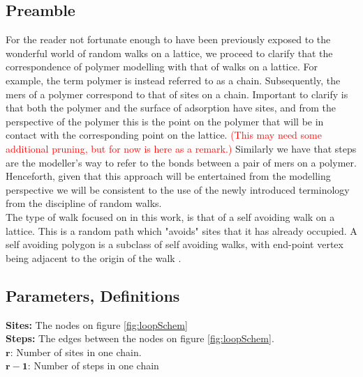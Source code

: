 \documentclass[12pt,letterpaper]{article}
\begin{document}
\subsection{Preamble}

For the reader not fortunate enough to have been previously exposed to the wonderful world of random walks on a lattice, we proceed to clarify that the correspondence of polymer modelling with that of walks on a lattice. For example, the term polymer is instead referred to as a chain. Subsequently, the mers of a polymer correspond to that of sites on a chain. Important to clarify is that both the polymer and the surface of adsorption have sites, and from the perspective of the polymer this is the point on the polymer that will be in contact with the corresponding point on the lattice.
\textcolor{red}{(This may need some additional pruning, but for now is here as a remark.)} 
Similarly we have that steps are the modeller's way to refer to the bonds between a pair of mers on  a polymer. Henceforth, given that this approach will be entertained from the modelling perspective we will be consistent to the use of the newly introduced terminology from the discipline of random walks.\\




The type of walk focused on in this work, is that of a self avoiding walk on a lattice. This is a random path which "avoids" sites that it has already occupied. A self avoiding polygon is a subclass of self avoiding walks, with end-point vertex being adjacent to the origin of the walk \cite{guttmann1988self}.\\

\subsection{Parameters, Definitions}
\textbf{Sites:} The nodes on figure \ref{fig:loopSchem}\\

\textbf{Steps:} The edges between the nodes on figure 
\ref{fig:loopSchem}.\\

$
\boldsymbol{
    r
}
$: 
Number of sites in one chain.\\

$
\boldsymbol{
    r
    -
    1
}
$: 
Number of steps in one chain\\
\end{document}
